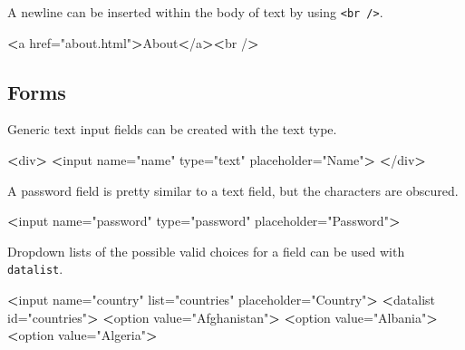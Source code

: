 \documentclass[]{book}
\newenvironment{Shaded}{\begin{snugshade}}{\end{snugshade}}
\newcommand{\StringTok}[1]{\textcolor[rgb]{0.31,0.60,0.02}{#1}}
\newcommand{\OperatorTok}[1]{\textcolor[rgb]{0.81,0.36,0.00}{\textbf{#1}}}
\newcommand{\ExtensionTok}[1]{#1}
\newcommand{\NormalTok}[1]{#1}
\begin{document}
A newline can be inserted within the body of text by using
\texttt{\textless{}br\ /\textgreater{}}.

\begin{Shaded}
\begin{Highlighting}[]
\OperatorTok{<}\ExtensionTok{a}\NormalTok{ href=}\StringTok{"about.html"}\OperatorTok{>}\NormalTok{About}\OperatorTok{<}\NormalTok{/a}\OperatorTok{><}\NormalTok{br /}\OperatorTok{>}
\end{Highlighting}
\end{Shaded}

\subsection{Forms}\label{forms}

Generic text input fields can be created with the text type.

\begin{Shaded}
\begin{Highlighting}[]
\OperatorTok{<}\ExtensionTok{div}\OperatorTok{>}
\OperatorTok{<}\ExtensionTok{input}\NormalTok{ name=}\StringTok{"name"}\NormalTok{ type=}\StringTok{"text"}\NormalTok{ placeholder=}\StringTok{"Name"}\OperatorTok{>}
\OperatorTok{<}\NormalTok{/}\ExtensionTok{div}\OperatorTok{>}
\end{Highlighting}
\end{Shaded}

A password field is pretty similar to a text field, but the characters
are obscured.

\begin{Shaded}
\begin{Highlighting}[]
\OperatorTok{<}\ExtensionTok{input}\NormalTok{ name=}\StringTok{"password"}\NormalTok{ type=}\StringTok{"password"}\NormalTok{ placeholder=}\StringTok{"Password"}\OperatorTok{>}
\end{Highlighting}
\end{Shaded}

Dropdown lists of the possible valid choices for a field can be used
with \texttt{datalist}.

\begin{Shaded}
\begin{Highlighting}[]
\OperatorTok{<}\ExtensionTok{input}\NormalTok{ name=}\StringTok{"country"}\NormalTok{ list=}\StringTok{"countries"}\NormalTok{ placeholder=}\StringTok{"Country"}\OperatorTok{>}
\OperatorTok{<}\ExtensionTok{datalist}\NormalTok{ id=}\StringTok{"countries"}\OperatorTok{>}
    \OperatorTok{<}\ExtensionTok{option}\NormalTok{ value=}\StringTok{"Afghanistan"}\OperatorTok{>}
    \OperatorTok{<}\ExtensionTok{option}\NormalTok{ value=}\StringTok{"Albania"}\OperatorTok{>}
    \OperatorTok{<}\ExtensionTok{option}\NormalTok{ value=}\StringTok{"Algeria"}\OperatorTok{>}
\end{Highlighting}
\end{Shaded}
\end{document}
